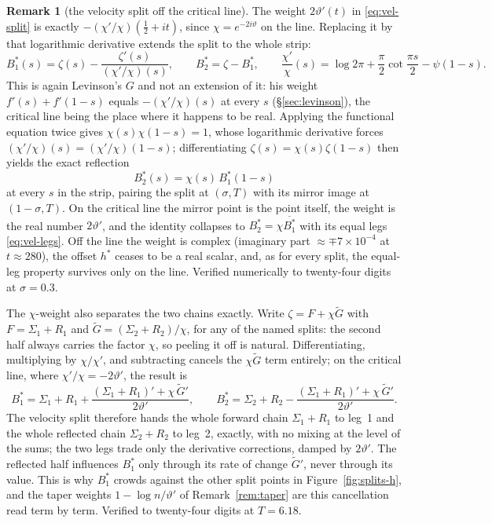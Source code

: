 \documentclass[11pt]{article}
\theoremstyle{definition}
\newtheorem{remark}[theorem]{Remark}
\begin{document}
\begin{remark}[the velocity split off the critical line]\label{rem:vel-offline}
The weight $2\vartheta'(t)$ in \eqref{eq:vel-split} is exactly
$-(\chi'/\chi)(\tfrac12+it)$, since $\chi=e^{-2i\vartheta}$ on the line.
Replacing it by that logarithmic derivative extends the split to the whole
strip:
\begin{equation}\label{eq:vel-split-offline}
B_1^{\ast}(s)=\zeta(s)-\frac{\zeta'(s)}{(\chi'/\chi)(s)},
\qquad
B_2^{\ast}=\zeta-B_1^{\ast},
\qquad
\frac{\chi'}{\chi}(s)=\log 2\pi+\frac{\pi}{2}\cot\frac{\pi s}{2}-\psi(1-s).
\end{equation}
This is again Levinson's $G$ and not an extension of it: his weight
$f'(s)+f'(1-s)$ equals $-(\chi'/\chi)(s)$ at every $s$
(\S\ref{sec:levinson}), the critical line being the place where it happens to
be real.
Applying the functional equation twice gives $\chi(s)\chi(1-s)=1$, whose
logarithmic derivative forces $(\chi'/\chi)(s)=(\chi'/\chi)(1-s)$;
differentiating $\zeta(s)=\chi(s)\zeta(1-s)$ then yields the exact reflection
\[
B_2^{\ast}(s)=\chi(s)\,B_1^{\ast}(1-s)
\]
at every $s$ in the strip, pairing the split at $(\sigma,T)$ with its mirror
image at $(1-\sigma,T)$. On the critical line the mirror point is the point
itself, the weight is the real number $2\vartheta'$, and the identity
collapses to $B_2^{\ast}=\chi\overline{B_1^{\ast}}$ with its equal legs
\eqref{eq:vel-legs}. Off the line the weight is complex (imaginary part
$\approx\mp7\times10^{-4}$ at $t\approx280$), the offset $h^{\ast}$ ceases to
be a real scalar, and, as for every split, the equal-leg property survives
only on the line. Verified numerically to twenty-four digits at $\sigma=0.3$.

The $\chi$-weight also separates the two chains exactly. Write
$\zeta=F+\chi\widetilde G$ with $F=\Sigma_1+R_1$ and
$\widetilde G=(\Sigma_2+R_2)/\chi$, for any of the named splits: the second
half always carries the factor $\chi$, so peeling it off is natural.
Differentiating, multiplying by $\chi/\chi'$, and subtracting cancels the
$\chi\widetilde G$ term entirely; on the critical line, where
$\chi'/\chi=-2\vartheta'$, the result is
\begin{equation}\label{eq:vel-split-halves}
B_1^{\ast}
=\Sigma_1+R_1+\frac{(\Sigma_1+R_1)'+\chi\,\widetilde G'}{2\vartheta'},
\qquad
B_2^{\ast}
=\Sigma_2+R_2-\frac{(\Sigma_1+R_1)'+\chi\,\widetilde G'}{2\vartheta'}.
\end{equation}
The velocity split therefore hands the whole forward chain $\Sigma_1+R_1$ to
leg~1 and the whole reflected chain $\Sigma_2+R_2$ to leg~2, exactly, with no
mixing at the level of the sums; the two legs trade only the derivative
corrections, damped by $2\vartheta'$. The reflected
half influences $B_1^{\ast}$ only through its rate of change
$\widetilde G'$, never through its value. This is why $B_1^{\ast}$ crowds
against the other split points in Figure~\ref{fig:splits-h}, and the taper
weights $1-\log n/\vartheta'$ of Remark~\ref{rem:taper} are this cancellation
read term by term. Verified to twenty-four digits at $T=6.18$.
\end{remark}
\end{document}
